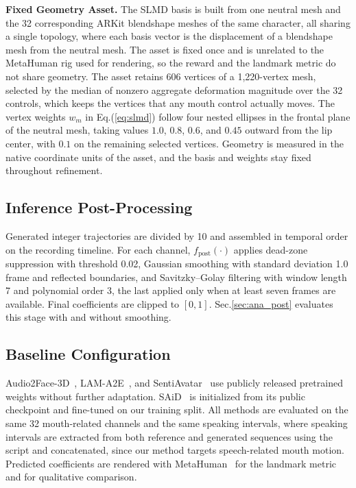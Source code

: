 \noindent\textbf{Fixed Geometry Asset.}\quad
The SLMD basis is built from one neutral mesh and the 32 corresponding ARKit blendshape meshes of the same character, all sharing a single topology, where each basis vector is the displacement of a blendshape mesh from the neutral mesh. The asset is fixed once and is unrelated to the MetaHuman rig used for rendering, so the reward and the landmark metric do not share geometry. The asset retains 606 vertices of a 1{,}220-vertex mesh, selected by the median of nonzero aggregate deformation magnitude over the 32 controls, which keeps the vertices that any mouth control actually moves. The vertex weights $w_{m}$ in Eq.(\ref{eq:slmd}) follow four nested ellipses in the frontal plane of the neutral mesh, taking values $1.0$, $0.8$, $0.6$, and $0.45$ outward from the lip center, with $0.1$ on the remaining selected vertices. Geometry is measured in the native coordinate units of the asset, and the basis and weights stay fixed throughout refinement.

\subsection{Inference Post-Processing}
\label{app:postprocessing}

Generated integer trajectories are divided by 10 and assembled in temporal order on the recording timeline. For each channel, $f_{\mathrm{post}}(\cdot)$ applies dead-zone suppression with threshold 0.02, Gaussian smoothing with standard deviation 1.0 frame and reflected boundaries, and Savitzky--Golay filtering with window length 7 and polynomial order 3, the last applied only when at least seven frames are available. Final coefficients are clipped to $[0,1]$. Sec.\ref{sec:ana_post} evaluates this stage with and without smoothing.

\subsection{Baseline Configuration}
\label{app:baselines}

Audio2Face-3D~\citep{chung2025audio2face}, LAM-A2E~\citep{lam}, and SentiAvatar~\citep{jin2026sentiavatar} use publicly released pretrained weights without further adaptation. SAiD~\citep{park2023said} is initialized from its public checkpoint and fine-tuned on our training split. All methods are evaluated on the same 32 mouth-related channels and the same speaking intervals, where speaking intervals are extracted from both reference and generated sequences using the script and concatenated, since our method targets speech-related mouth motion. Predicted coefficients are rendered with MetaHuman~\citep{metahuman} for the landmark metric and for qualitative comparison.

